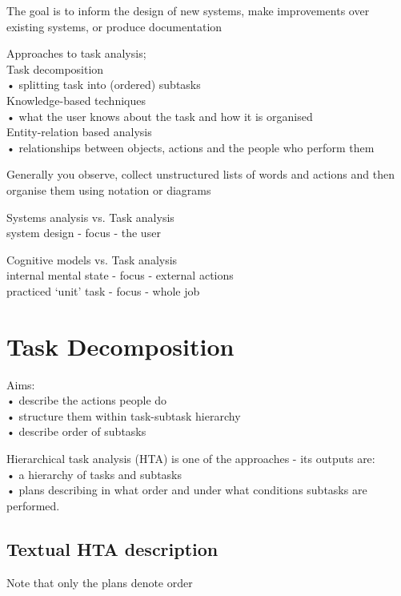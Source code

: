 \documentclass[]{project_plan}
\begin{document}
The goal is to inform the design of new
systems, make improvements over existing
systems, or produce documentation

Approaches to task analysis;\\
Task decomposition\\
• splitting task into (ordered) subtasks\\
Knowledge-based techniques\\
• what the user knows about the task and how it is organised\\
Entity-relation based analysis\\
• relationships between objects, actions and the people who perform them

Generally you observe, collect unstructured lists of words and actions and then organise them using notation or diagrams

\begin{center}
  Systems analysis vs. Task analysis\\
  system design - focus - the user

  Cognitive models vs. Task analysis\\
  internal mental state - focus - external actions\\
  practiced ‘unit’ task - focus - whole job
\end{center}

\section{Task Decomposition}

Aims:\\
• describe the actions people do\\
• structure them within task-subtask hierarchy\\
• describe order of subtasks

Hierarchical task analysis (HTA) is one of
the approaches - its outputs are:\\
• a hierarchy of tasks and subtasks\\
• plans describing in what order and under what
conditions subtasks are performed.

\newpage

\subsection{Textual HTA description}
Note that only the plans denote order
\end{document}
